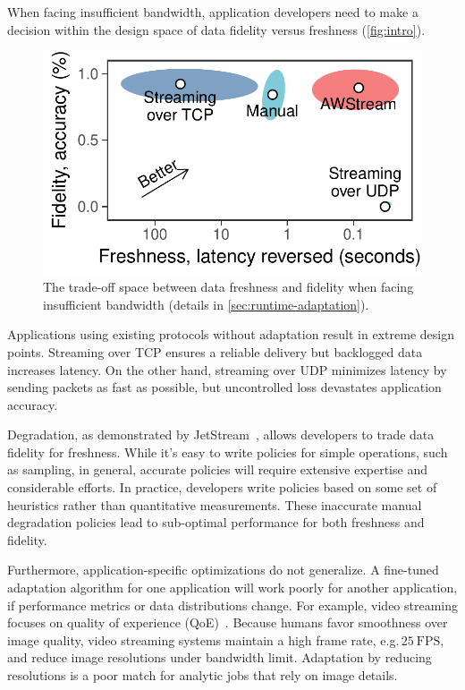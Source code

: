When facing insufficient bandwidth, application developers need to make a
decision within the design space of data fidelity versus freshness
(\autoref{fig:intro}).

\begin{figure}
  \centering
  \includegraphics[width=0.8\columnwidth]{figures/figure1.pdf}
  \caption{The trade-off space between data freshness and fidelity when facing
    insufficient bandwidth (details in \autoref{sec:runtime-adaptation}).}
  \label{fig:intro}
  \vspace{-1em}
\end{figure}

Applications using existing protocols without adaptation result in extreme
design points. Streaming over TCP ensures a reliable delivery but backlogged
data increases latency. On the other hand, streaming over UDP minimizes latency
by sending packets as fast as possible, but uncontrolled loss devastates
application accuracy.

Degradation, as demonstrated by JetStream~\cite{rabkin2014aggregation}, allows
developers to trade data fidelity for freshness. While it's easy to write
policies for simple operations, such as sampling, in general, accurate policies
will require extensive expertise and considerable efforts. In practice,
developers write policies based on some set of heuristics rather than
quantitative measurements. These inaccurate manual degradation policies lead to
sub-optimal performance for both freshness and fidelity.

Furthermore, application-specific optimizations do not generalize. A fine-tuned
adaptation algorithm for one application will work poorly for another
application, if performance metrics or data distributions change.  For example,
video streaming focuses on quality of experience
(QoE)~\cite{michalos2012dynamic, pantos2016http, yin2015control}. Because humans
favor smoothness over image quality, video streaming systems maintain a high
frame rate, e.g.\,\(25~\text{FPS}\), and reduce image resolutions under
bandwidth limit.  Adaptation by reducing resolutions is a poor match for
analytic jobs that rely on image details.

